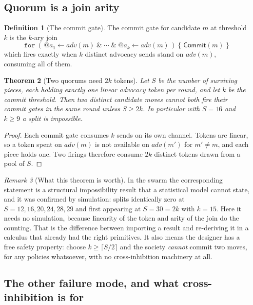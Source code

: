\documentclass[11pt,a4paper]{article}
\makeatletter
\theoremstyle{plain}
\newtheorem{theorem}{Theorem}[section]
\theoremstyle{definition}
\newtheorem{definition}[theorem]{Definition}
\theoremstyle{remark}
\newtheorem{remark}[theorem]{Remark}
\newcommand{\qt}[1]{\ensuremath{@#1}}
\makeatother
\begin{document}
\subsection{Quorum is a join arity}

\begin{definition}[The commit gate]
\label{def:gate}
The commit gate for candidate $m$ at threshold $k$ is the $k$-ary join
\[
  \texttt{for}\;(\,\qt{a_1} \leftarrow \mathit{adv}(m)\;\&\;\cdots\;\&\;
  \qt{a_k} \leftarrow \mathit{adv}(m)\,)\;\{\;\mathsf{Commit}(m)\;\}
\]
which fires exactly when $k$ distinct advocacy sends stand on $\mathit{adv}(m)$,
consuming all of them.
\end{definition}

\begin{theorem}[Two quorums need $2k$ tokens]
\label{thm:2k}
Let $S$ be the number of surviving pieces, each holding exactly one linear
advocacy token per round, and let $k$ be the commit threshold. Then two distinct
candidate moves cannot both fire their commit gates in the same round unless
$S \geq 2k$. In particular with $S = 16$ and $k \geq 9$ a split is impossible.
\end{theorem}

\begin{proof}
Each commit gate consumes $k$ sends on its own channel. Tokens are linear, so a
token spent on $\mathit{adv}(m)$ is not available on $\mathit{adv}(m')$ for
$m' \neq m$, and each piece holds one. Two firings therefore consume $2k$
distinct tokens drawn from a pool of $S$.
\end{proof}

\begin{remark}[What this theorem is worth]
\label{rem:2kworth}
In the swarm the corresponding statement is a structural impossibility result
that a statistical model cannot state, and it was confirmed by simulation:
splits identically zero at $S = 12,16,20,24,28,29$ and first appearing at
$S = 30 = 2k$ with $k = 15$. Here it needs no simulation, because linearity of
the token and arity of the join do the counting. That is the difference between
importing a result and re-deriving it in a calculus that already had the right
primitives. It also means the designer has a free safety property: choose
$k \geq \lceil S/2 \rceil$ and the society \emph{cannot} commit two moves, for
any policies whatsoever, with no cross-inhibition machinery at all.
\end{remark}

\subsection{The other failure mode, and what cross-inhibition is for}
\end{document}
